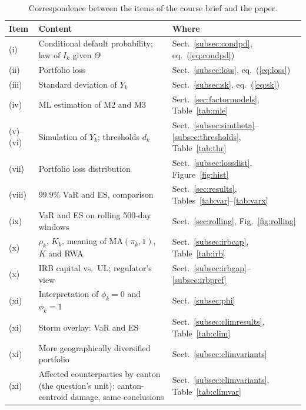 \begin{table}[htb]
\caption{Correspondence between the items of the course brief and the paper.}
\label{tab:map}
\centering
{\small\setlength{\tabcolsep}{4pt}
\begin{tabular}{@{}lp{}l@{}}
\toprule
Item & Content & Where \\
\midrule
(i) & Conditional default probability; law of $I_k$ given $\Theta$ & Sect.~\ref{subsec:condpd}, eq.~(\ref{eq:condpd}) \\
(ii) & Portfolio loss & Sect.~\ref{subsec:loss}, eq.~(\ref{eq:loss}) \\
(iii) & Standard deviation of $Y_k$ & Sect.~\ref{subsec:sk}, eq.~(\ref{eq:sk}) \\
(iv) & ML estimation of M2 and M3 & Sect.~\ref{sec:factormodels}, Table~\ref{tab:mle} \\
(v)--(vi) & Simulation of $Y_k$; thresholds $d_k$ & Sect.~\ref{subsec:simtheta}--\ref{subsec:thresholds}, Table~\ref{tab:thr} \\
(vii) & Portfolio loss distribution & Sect.~\ref{subsec:lossdist}, Figure~\ref{fig:hist} \\
(viii) & $99.9\%$ VaR and ES, comparison & Sect.~\ref{sec:results}, Tables~\ref{tab:var}--\ref{tab:varx} \\
(ix) & VaR and ES on rolling 500-day windows & Sect.~\ref{sec:rolling}, Fig.~\ref{fig:rolling} \\
(x) & $\rho_k$, $K_k$, meaning of $\mathrm{MA}(\pi_k,1)$, $K$ and RWA & Sect.~\ref{subsec:irbcap}, Table~\ref{tab:irb} \\
(x) & IRB capital vs.\ UL; regulator's view & Sect.~\ref{subsec:irbgap}--\ref{subsec:irbpref} \\
(xi) & Interpretation of $\phi_k=0$ and $\phi_k=1$ & Sect.~\ref{subsec:phi} \\
(xi) & Storm overlay: VaR and ES & Sect.~\ref{subsec:climresults}, Table~\ref{tab:clim} \\
(xi) & More geographically diversified portfolio & Sect.~\ref{subsec:climvariants} \\
(xi) & Affected counterparties by canton (the question's unit): canton-centroid damage, same conclusions & Sect.~\ref{subsec:climvariants}, Table~\ref{tab:climvar} \\
\bottomrule
\end{tabular}}
\end{table}

